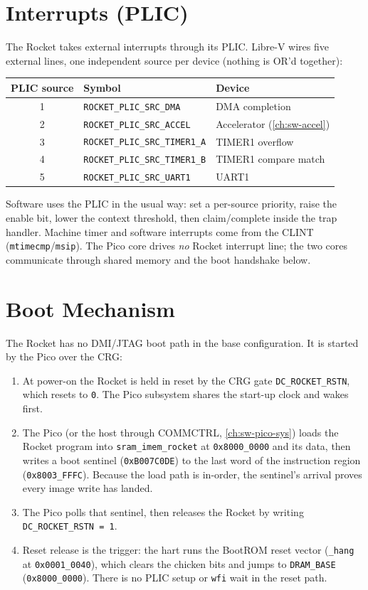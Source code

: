 \section{Interrupts (PLIC)}
The Rocket takes external interrupts through its PLIC. Libre-V wires five external lines, one
independent source per device (nothing is OR'd together):

\begin{tabular}{@{}cll@{}}
\toprule
\textbf{PLIC source} & \textbf{Symbol} & \textbf{Device} \\
\midrule
1 & \texttt{ROCKET\_PLIC\_SRC\_DMA}      & DMA completion \\
2 & \texttt{ROCKET\_PLIC\_SRC\_ACCEL}    & Accelerator (\autoref{ch:sw-accel}) \\
3 & \texttt{ROCKET\_PLIC\_SRC\_TIMER1\_A}& TIMER1 overflow \\
4 & \texttt{ROCKET\_PLIC\_SRC\_TIMER1\_B}& TIMER1 compare match \\
5 & \texttt{ROCKET\_PLIC\_SRC\_UART1}    & UART1 \\
\bottomrule
\end{tabular}

Software uses the PLIC in the usual way: set a per-source priority, raise the enable bit, lower the
context threshold, then claim/complete inside the trap handler. Machine timer and software interrupts
come from the CLINT (\texttt{mtimecmp}/\texttt{msip}). The Pico core drives \emph{no} Rocket interrupt
line; the two cores communicate through shared memory and the boot handshake below.

\section{Boot Mechanism}\label{sec:rocket-boot}
The Rocket has no DMI/JTAG boot path in the base configuration. It is started by the Pico over the CRG:

\begin{enumerate}[nosep]
  \item At power-on the Rocket is held in reset by the CRG gate \texttt{DC\_ROCKET\_RSTN}, which resets
        to \texttt{0}. The Pico subsystem shares the start-up clock and wakes first.
  \item The Pico (or the host through COMMCTRL, \autoref{ch:sw-pico-sys}) loads the Rocket program into
        \texttt{sram\_imem\_rocket} at \texttt{0x8000\_0000} and its data, then writes a boot sentinel
        (\texttt{0xB007C0DE}) to the last word of the instruction region (\texttt{0x8003\_FFFC}). Because
        the load path is in-order, the sentinel's arrival proves every image write has landed.
  \item The Pico polls that sentinel, then releases the Rocket by writing \texttt{DC\_ROCKET\_RSTN = 1}.
  \item Reset release is the trigger: the hart runs the BootROM reset vector (\texttt{\_hang} at
        \texttt{0x0001\_0040}), which clears the chicken bits and jumps to \texttt{DRAM\_BASE}
        (\texttt{0x8000\_0000}). There is no PLIC setup or \texttt{wfi} wait in the reset path.
\end{enumerate}

